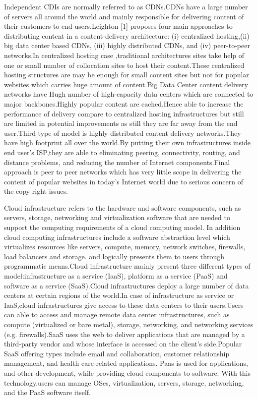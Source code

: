 Independent CDIs are normally referred to as CDNs.CDNs have a large number of servers all around the world and mainly responsible for delivering content of their customers to end users.Leighton [1] proposes four main approaches to distributing content in a content-delivery architecture: (i) centralized hosting,(ii) big data center based CDNs, (iii) highly distributed CDNs, and (iv) peer-to-peer networks.In centralized hosting case ,traditional architectures sites take help of one or small number of collocation sites to host their content.These centralized
hosting structures are may be enough for small content sites but not for popular websites which carries huge amount of content.Big Data Center content
delivery networks have Hugh number of high-capacity data centers which are
connected to major backbones.Highly popular content are cached.Hence able to
increase the performance of delivery compare to centralized hosting infrastructures 
but still are limited in potential improvements as still they are far away
from the end user.Third type of model is highly distributed content delivery 
networks.They have high footprint all over the world.By putting their own
infrastructures inside end user's ISP,they are able to eliminating peering, 
connectivity, routing, and distance problems, and reducing the number of Internet
components.Final approach is peer to peer networks which has very little scope
in delivering the content of popular websites in today's Internet world due to
serious concern of the copy right issues.

Cloud infrastructure refers to the hardware and software components, such as servers, storage, networking and virtualization software that are needed to support the computing requirements of a cloud computing model. In addition cloud computing infrastructures include a software abstraction level which virtualizes resources like servers, compute, memory, network switches, firewalls, load balancers and storage. and logically presents them to users through programmatic means.Cloud infrastructure mainly present three different types of model:infrastructure as a service (IaaS), platform as a service (PaaS) and software as a service (SaaS).Cloud infrastructures deploy a large number of data centers at certain regions of the world.In case of infrastructure as service or IaaS,cloud infrastructures give access to these data centers to their users.Users can able to access and manage remote data center infrastructures, such as compute (virtualized or bare metal), storage, networking, and networking services (e.g. firewalls).SaaS uses the web to deliver applications that are managed by a third-party vendor and whose interface is accessed on the client's side.Popular SaaS offering types include email and collaboration, customer relationship management, and health care-related applications. Paas is used for applications, and other development, while providing cloud components to software. With this technology,users can manage OSes, virtualization, servers, storage, networking, and the PaaS software itself.

